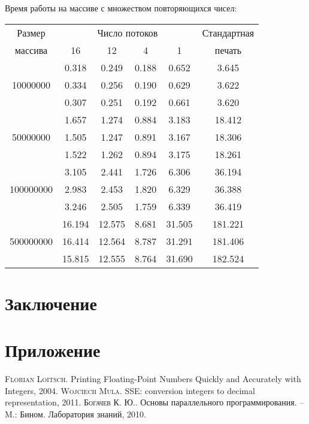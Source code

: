 \documentclass[a4paper, 12pt, twoside]{article}
\begin{document}
Время работы на массиве с множеством повторяющихся чисел:
\begin{center}
\begin{tabular}{||c|c|c|c|c|c||}
\hline
\hline
Размер & \multicolumn{4}{c|}{Число потоков} & Стандартная\\
\hhline{~|-|-|-|-|~|}
массива & 16 & 12 & 4 & 1 & печать \\
\hline
\hline
& 0.318 & 0.249 & 0.188 & 0.652 & 3.645 \\
\hhline{~|-|-|-|-|-|}
10000000 & 0.334 & 0.256 & 0.190 & 0.629 & 3.622 \\
\hhline{~|-|-|-|-|-|}
& 0.307 & 0.251 & 0.192 & 0.661 & 3.620 \\
\hline
& 1.657 & 1.274 & 0.884 & 3.183 & 18.412 \\
\hhline{~|-|-|-|-|-|}
50000000 & 1.505 & 1.247 & 0.891 & 3.167 & 18.306 \\
\hhline{~|-|-|-|-|-|}
& 1.522 & 1.262 & 0.894 & 3.175 & 18.261 \\
\hline
& 3.105 & 2.441 & 1.726 & 6.306 & 36.194 \\
\hhline{~|-|-|-|-|-|}
100000000 & 2.983 & 2.453 & 1.820 & 6.329 & 36.388 \\
\hhline{~|-|-|-|-|-|}
& 3.246 & 2.505 & 1.759 & 6.339 &  36.419 \\
\hline
& 16.194 & 12.575 & 8.681 & 31.505 & 181.221 \\
\hhline{~|-|-|-|-|-|}
500000000 & 16.414 & 12.564 & 8.787 & 31.291 & 181.406 \\
\hhline{~|-|-|-|-|-|}
& 15.815 & 12.555  & 8.764 & 31.690 & 182.524 \\
\hline
\hline
\end{tabular}
\end{center}

\section{Заключение}
\newpage

\appendix
\section*{Приложение}
\renewcommand{\thesubsection}{(\Alph{subsection})}

\newpage
\begin{thebibliography}{}

 \textsc{Florian Loitsch}.
Printing Floating-Point Numbers Quickly and Accurately with Integers, 2004.
 \textsc{Wojciech Mula}.
SSE: conversion integers to decimal representation, 2011.
 \textsc{Богачев К. Ю.}. 
Основы параллельного программирования. -- M.: Бином. Лаборатория знаний, 2010.


\end{thebibliography}
\end{document}

